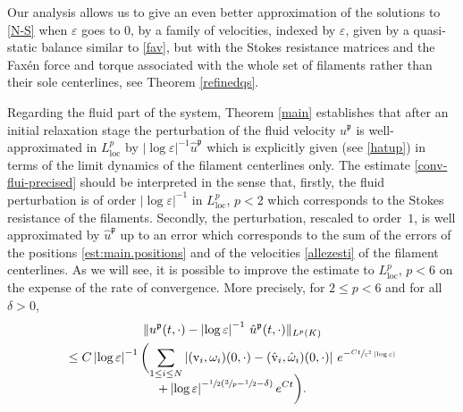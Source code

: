 \documentclass[10pt]{amsart}
\let\eps\varepsilon
\newcommand{\loc}{\mathrm{loc}}
\theoremstyle{definition}
\theoremstyle{remark}
\begin{document}
Our analysis allows us to give an even better approximation of the solutions to \eqref{N-S} when $\eps$ goes to $0$,
by a family of velocities, indexed by $\eps$, given by a quasi-static balance similar to \eqref{fav}, but with the Stokes resistance matrices and the Faxén force and torque
associated with the whole set of filaments rather than their sole centerlines, see Theorem \ref{refinedqs}.

Regarding the fluid part of the system, Theorem \ref{main} establishes that
after an initial relaxation stage the perturbation of the fluid velocity ${u}^\mathfrak{p}$ is well-approximated in $L^p_\loc$ by $\left|\log \eps\right|^{-1} \hat {u}^\mathfrak{p}$ which is explicitly given (see \eqref{hatup}) in terms of the limit dynamics of the filament centerlines only. The estimate
\eqref{conv-flui-precised} should be interpreted in the sense that, firstly, the fluid perturbation is of order $\left|\log \eps\right|^{-1}$ in $L^p_\loc$, $p<2$ which corresponds to the Stokes resistance of the filaments. Secondly, the perturbation, rescaled to order~$1$, is well approximated by $ \hat {u}^\mathfrak{p}$ up to an error which corresponds to the sum of the errors of the positions \eqref{est:main.positions} and of the velocities \eqref{allezesti} of the filament centerlines.
As we will see, it is possible to improve the estimate to $L^p_\loc$, $p< 6$ on the expense of the rate of convergence. More precisely, for $2 \leq p < 6$ and for all $\delta > 0$,
\begin{multline}
\label{conv-flui-precised.comment}
\| u^\mathfrak{p}(t,\cdot) - \left|\log \eps\right|^{-1} \, {\hat u}^\mathfrak{p} (t,\cdot) \|_{L^p (K) } \\
\leq
C \left|\log \eps\right|^{-1} \biggl(\sum_{1 \leq i \leq N} \left| (\textrm{v}_i,\omega_i) (0,\cdot) - (\hat{\textrm{v}}_i,{\hat \omega}_i)(0,\cdot)
\right| \, e^{- \sfrac{C t}{\eps^2 \left|\log \eps\right|}}\\[-8pt]
+ \left|\log \eps\right|^{-\sfrac 1 2(\sfrac 3 p - \sfrac 1 2 - \delta)} e^{C t} \biggr).
\end{multline}
\end{document}
